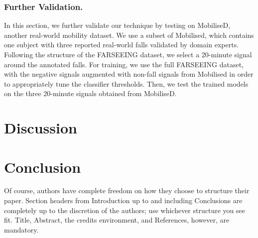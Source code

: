 \documentclass[runningheads]{llncs}
\begin{document}
\subsubsection{Further Validation.}
In this section, we further validate our technique by testing on MobiliseD, another real-world mobility dataset. We use a subset of Mobilised, which contains one subject with three reported real-world falls validated by domain experts. Following the structure of the FARSEEING dataset, we select a 20-minute signal around the annotated falls. For training, we use the full FARSEEING dataset, with the negative signals augmented with non-fall signals from Mobilised in order to appropriately tune the classifier thresholds. Then, we test the trained models on the three 20-minute signals obtained from MobiliseD.

\section{Discussion}

\section{Conclusion}

Of course, authors have complete freedom on how they choose to structure their paper. Section headers from Introduction up to and including Conclusions are completely up to the discretion of the authors; use whichever structure you see fit. Title, Abstract, the credits environment, and References, however, are mandatory.
\end{document}
